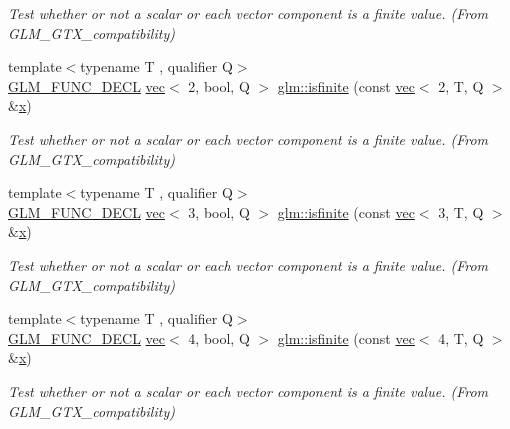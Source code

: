 \begin{DoxyCompactItemize}
\begin{DoxyCompactList}\small\item\em Test whether or not a scalar or each vector component is a finite value. (From G\+L\+M\+\_\+\+G\+T\+X\+\_\+compatibility) \end{DoxyCompactList}\item 
{\footnotesize template$<$typename T , qualifier Q$>$ }\\\mbox{\hyperlink{setup_8hpp_ab2d052de21a70539923e9bcbf6e83a51}{G\+L\+M\+\_\+\+F\+U\+N\+C\+\_\+\+D\+E\+CL}} \mbox{\hyperlink{structglm_1_1vec}{vec}}$<$ 2, bool, Q $>$ \mbox{\hyperlink{group__gtx__compatibility_ga8e76dc3e406ce6a4155c2b12a2e4b084}{glm\+::isfinite}} (const \mbox{\hyperlink{structglm_1_1vec}{vec}}$<$ 2, T, Q $>$ \&\mbox{\hyperlink{_s_d_l__opengl_8h_ad0e63d0edcdbd3d79554076bf309fd47}{x}})
\begin{DoxyCompactList}\small\item\em Test whether or not a scalar or each vector component is a finite value. (From G\+L\+M\+\_\+\+G\+T\+X\+\_\+compatibility) \end{DoxyCompactList}\item 
{\footnotesize template$<$typename T , qualifier Q$>$ }\\\mbox{\hyperlink{setup_8hpp_ab2d052de21a70539923e9bcbf6e83a51}{G\+L\+M\+\_\+\+F\+U\+N\+C\+\_\+\+D\+E\+CL}} \mbox{\hyperlink{structglm_1_1vec}{vec}}$<$ 3, bool, Q $>$ \mbox{\hyperlink{group__gtx__compatibility_ga929ef27f896d902c1771a2e5e150fc97}{glm\+::isfinite}} (const \mbox{\hyperlink{structglm_1_1vec}{vec}}$<$ 3, T, Q $>$ \&\mbox{\hyperlink{_s_d_l__opengl_8h_ad0e63d0edcdbd3d79554076bf309fd47}{x}})
\begin{DoxyCompactList}\small\item\em Test whether or not a scalar or each vector component is a finite value. (From G\+L\+M\+\_\+\+G\+T\+X\+\_\+compatibility) \end{DoxyCompactList}\item 
{\footnotesize template$<$typename T , qualifier Q$>$ }\\\mbox{\hyperlink{setup_8hpp_ab2d052de21a70539923e9bcbf6e83a51}{G\+L\+M\+\_\+\+F\+U\+N\+C\+\_\+\+D\+E\+CL}} \mbox{\hyperlink{structglm_1_1vec}{vec}}$<$ 4, bool, Q $>$ \mbox{\hyperlink{group__gtx__compatibility_ga19925badbe10ce61df1d0de00be0b5ad}{glm\+::isfinite}} (const \mbox{\hyperlink{structglm_1_1vec}{vec}}$<$ 4, T, Q $>$ \&\mbox{\hyperlink{_s_d_l__opengl_8h_ad0e63d0edcdbd3d79554076bf309fd47}{x}})
\begin{DoxyCompactList}\small\item\em Test whether or not a scalar or each vector component is a finite value. (From G\+L\+M\+\_\+\+G\+T\+X\+\_\+compatibility) \end{DoxyCompactList}\end{DoxyCompactItemize}


